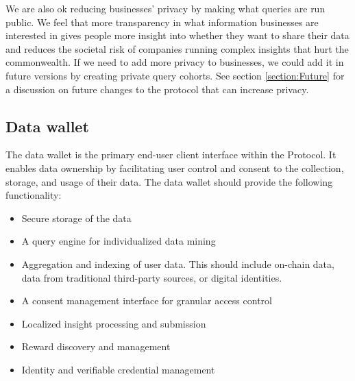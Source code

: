 We are also ok reducing businesses' privacy by making what queries are run public. We feel that more transparency in what information businesses are interested 
in gives people more insight into whether they want to share their data and reduces the societal risk of companies running complex insights that hurt the 
commonwealth. If we need to add more privacy to businesses, we could add it in future versions by creating private query cohorts. See section \ref{section:Future} 
for a discussion on future changes to the protocol that can increase privacy.
\subsection{Data wallet}
\label{section:DataWallet}





The data wallet is the primary end-user client interface within the Protocol. It enables data ownership by facilitating user control 
and consent to the collection, storage, and usage of their data. The data wallet should provide the following functionality:
\begin{itemize}
  \item Secure storage of the data
  \item A query engine for individualized data mining
  \item Aggregation and indexing of user data. This should include on-chain data, data from traditional third-party sources, or digital identities.
  \item A consent management interface for granular access control
  \item Localized insight processing and submission
  \item Reward discovery and management
  \item Identity and verifiable credential management
\end{itemize}


